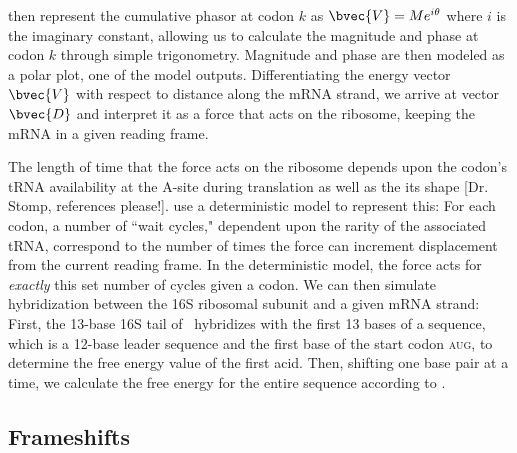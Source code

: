 \documentclass[12pt]{article}
\numberwithin{equation}{section}
\begin{document}
\citet{lalit:embs} then represent the cumulative phasor
at codon $k$ as $\bvec{V} = Me^{i\theta}$ where $i$ is the imaginary
constant, allowing us to calculate the magnitude and phase at codon
$k$ through simple trigonometry. Magnitude and phase are then modeled
as a polar plot, one of the model outputs. Differentiating the energy vector $\bvec{V}$
with respect to distance along the mRNA strand, we
arrive at vector $\bvec{D}$ and interpret it as
a force that acts on the ribosome, keeping the mRNA in
a given reading frame.
 
The length of time that the force acts on the ribosome depends upon
the codon's tRNA availability at the A-site during translation as well as the its shape [Dr. Stomp, references please!].
\citeauthor{lalit:mechanics} use a deterministic model to represent this: For each codon,
a number of ``wait cycles," dependent upon the rarity of the
associated tRNA, correspond to the number of times the force can
increment displacement from the current reading frame.  In the
deterministic model, the force acts for \emph{exactly} this set number
of cycles given a codon. We can then simulate hybridization between the
16S ribosomal subunit and a given mRNA strand: First, the 13-base 16S
tail of \ecoli\ hybridizes with the first 13 bases of a sequence,
which is a 12-base leader sequence and the first base of the start
codon \textsc{aug}, to determine the free energy value of the first acid.
Then, shifting one base pair at a time, we calculate the free energy
for the entire sequence according to \citet{starmer}.

\subsection{Frameshifts}
\label{section:frameshifts}
\end{document}
